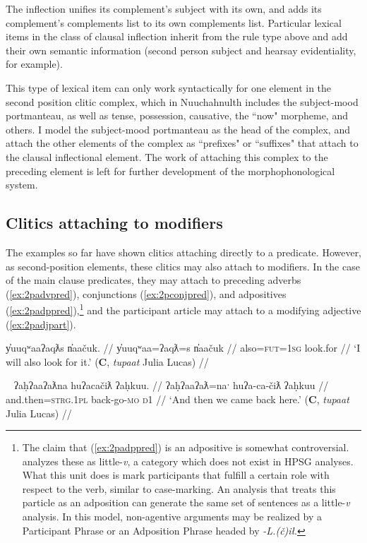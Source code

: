 The inflection unifies its complement's subject with its own, and adds its complement's complements list to its own complements list. Particular lexical items in the class of clausal inflection inherit from the rule type above and add their own semantic information (second person subject and hearsay evidentiality, for example).

This type of lexical item can only work syntactically for one element in the second position clitic complex, which in Nuuchahnulth includes the subject-mood portmanteau, as well as tense, possession, causative, the ``now" morpheme, and others. I model the subject-mood portmanteau as the head of the complex, and attach the other elements of the complex as ``prefixes" or ``suffixes" that attach to the clausal inflectional element. The work of attaching this complex to the preceding element is left for further development of the morphophonological system.

\subsection{Clitics attaching to modifiers} \label{sec:cliticmodifier}

The examples so far have shown clitics attaching directly to a predicate. However, as second-position elements, these clitics may also attach to modifiers. In the case of the main clause predicates, they may attach to preceding adverbs (\ref{ex:2padvpred}), conjunctions (\ref{ex:2pconjpred}), and adpositives (\ref{ex:2padppred}),\footnote{The claim that (\ref{ex:2padppred}) is an adpositive is somewhat controversial. \cite{woo2007b} analyzes these as little-\textit{v}, a category which does not exist in HPSG analyses. What this unit does is mark participants that fulfill a certain role with respect to the verb, similar to case-marking. An analysis that treats this particle as an adposition can generate the same set of sentences as a little-\textit{v} analysis. In this model, non-agentive arguments may be realized by a Participant Phrase or an Adposition Phrase headed by \textit{-L.(č)ił}.} and the participant article may attach to a modifying adjective (\ref{ex:2padjpart}).

\ex \label{ex:2padvpred}
\begingl
\glpreamble y̓uuqʷaaʔaqƛs n̓aačuk. //
\gla y̓uuqʷaa=ʔaqƛ=s n̓aačuk  //
\glb also=\textsc{fut}=\textsc{1sg} look.for //
\glft ‘I will also look for it.’ (\textbf{C}, \textit{tupaat} Julia Lucas) //
\endgl
\xe

\ex~ \label{ex:2pconjpred}
\begingl
\glpreamble ʔaḥʔaaʔaƛna huʔacačiƛ ʔaḥkuu. //
\gla ʔaḥʔaaʔaƛ=naˑ huʔa-ca-čiƛ ʔaḥkuu  //
\glb and.then=\textsc{strg.1pl} back-go-\textsc{mo} \textsc{d1} //
\glft ‘And then we came back here.’ (\textbf{C}, \textit{tupaat} Julia Lucas) //
\endgl
\xe

